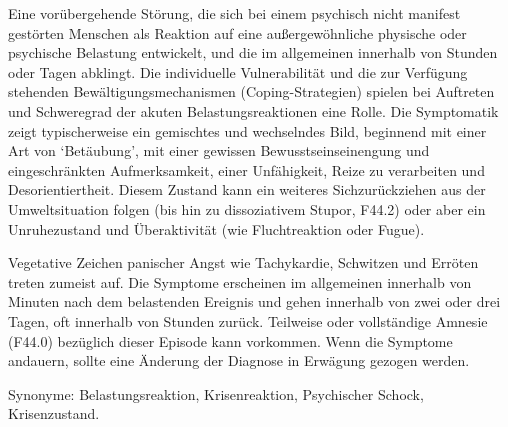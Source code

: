 {Eine vorübergehende Störung, die sich bei einem psychisch
nicht manifest gestörten Menschen als Reaktion auf eine
außergewöhnliche physische oder psychische Belastung
entwickelt, und die im allgemeinen innerhalb von Stunden
oder Tagen abklingt. Die individuelle Vulnerabilität und die
zur Verfügung stehenden Bewältigungsmechanismen
(Coping-Strategien) spielen bei Auftreten und Schweregrad
der akuten Belastungsreaktionen eine Rolle. Die Symptomatik
zeigt typischerweise ein gemischtes und wechselndes Bild,
beginnend mit einer Art von \enquote*{Betäubung}, mit einer
gewissen Bewusstseinseinengung und eingeschränkten Aufmerksamkeit,
einer Unfähigkeit, Reize zu verarbeiten und
Desorientiertheit. Diesem Zustand kann ein weiteres
Sichzurückziehen aus der Umweltsituation folgen (bis hin zu
dissoziativem Stupor, F44.2) oder aber ein
Unruhezustand und Überaktivität (wie Fluchtreaktion oder
Fugue). 

Vegetative Zeichen panischer Angst wie Tachykardie,
Schwitzen und Erröten treten zumeist auf. Die Symptome
erscheinen im allgemeinen innerhalb von Minuten nach dem
belastenden Ereignis und gehen innerhalb von zwei oder drei
Tagen, oft innerhalb von Stunden zurück. Teilweise oder
vollständige Amnesie (F44.0) bezüglich dieser Episode
kann vorkommen. Wenn die Symptome andauern, sollte eine
Änderung der Diagnose in Erwägung gezogen werden.

Synonyme: Belastungsreaktion, Krisenreaktion, Psychischer Schock, Krisenzustand.

}
